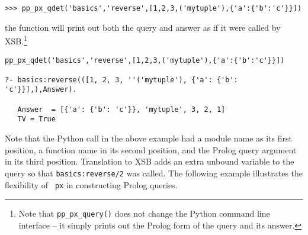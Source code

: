 \begin{example}
\begin{verbatim}
>>> pp_px_qdet('basics','reverse',[1,2,3,('mytuple'),{'a':{'b':'c'}}])
\end{verbatim}
\noindent
the function will print out both the query and answer as if it were
called by XSB.\footnote{Note that {\tt pp\_px\_query()} does not
  change the Python command line interface -- it simply prints out the
  Prolog form of the query and its answer.}

\begin{verbatim}
pp_px_qdet('basics','reverse',[1,2,3,('mytuple'),{'a':{'b':'c'}}])

?- basics:reverse(([1, 2, 3, ''('mytuple'), {'a': {'b': 'c'}}],),Answer).

   Answer  = [{'a': {'b': 'c'}}, 'mytuple', 3, 2, 1]
   TV = True
\end{verbatim}
\end{example}

Note that the Python call in the above example had a module name as
its first position, a function name in its second position, and the
Prolog query argument in its third position.  Translation to XSB adds
an extra unbound variable to the query so that {\tt basics:reverse/2}
was called.  The following example illustrates the flexibility of {\tt
  px} in constructing Prolog queries.

